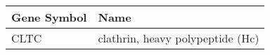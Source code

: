 \begin{tabular}{ll}
\toprule
Gene Symbol &                             Name \\
\midrule
       CLTC & clathrin, heavy polypeptide (Hc) \\
\bottomrule
\end{tabular}
